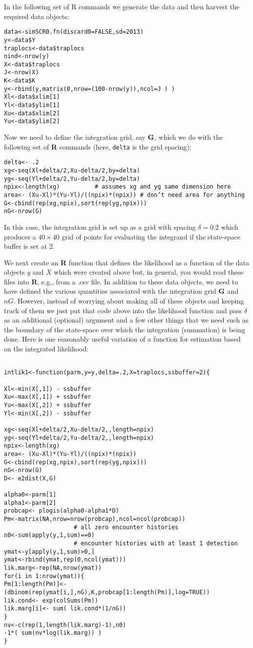 In the following set of R commands we generate the data and 
then harvest the required data objects:
\begin{verbatim}
data<-simSCR0.fn(discard0=FALSE,sd=2013)
y<-data$Y
traplocs<-data$traplocs
nind<-nrow(y)
X<-data$traplocs
J<-nrow(X)
K<-data$K
y<-rbind(y,matrix(0,nrow=(100-nrow(y)),ncol=J ) )
Xl<-data$xlim[1]
Yl<-data$ylim[1]
Xu<-data$xlim[2]
Yu<-data$ylim[2]
\end{verbatim}
Now we need to define the integration grid, say ${\bf G}$, which we do with
the following set of {\bf R} commands (here, \mbox{\tt delta} is the grid spacing):
\begin{verbatim}
delta<- .2
xg<-seq(Xl+delta/2,Xu-delta/2,by=delta) 
yg<-seq(Yl+delta/2,Yu-delta/2,by=delta) 
npix<-length(xg)          # assumes xg and yg same dimension here
area<- (Xu-Xl)*(Yu-Yl)/((npix)*(npix)) # don’t need area for anything
G<-cbind(rep(xg,npix),sort(rep(yg,npix)))
nG<-nrow(G)
\end{verbatim}
In this case, the integration grid is set up as a grid with spacing
$\delta = 0.2$ which produces a $40 \times 40$ grid of points for evaluating the
integrand if the state-space buffer is set at 2.

We next create an {\bf R} function that defines the likelihood as a function
of the data objects $y$ and $X$ which were created above but, in general,
you would read these files into {\bf R}, e.g., from a .csv file.
In addition to these data
objects, we need to have defined the various quantities associated
with the integration grid ${\bf G}$ and $nG$.
However, instead of worrying about making all of these objects and
keeping track of them we just put that code above into the likelihood
function and pass $\delta$ as an additional (optional) argument and a
few other things that we need such as the boundary of the state-space
over which the integration (summation) is being done.
Here is one reasonably useful variation of a function for estimation
based on the integrated likelihood:

{\small 
\begin{verbatim}

intlik1<-function(parm,y=y,delta=.2,X=traplocs,ssbuffer=2){

Xl<-min(X[,1]) - ssbuffer 
Xu<-max(X[,1]) + ssbuffer
Yu<-max(X[,2]) + ssbuffer
Yl<-min(X[,2]) - ssbuffer

xg<-seq(Xl+delta/2,Xu-delta/2,,length=npix) 
yg<-seq(Yl+delta/2,Yu-delta/2,,length=npix) 
npix<-length(xg)
area<- (Xu-Xl)*(Yu-Yl)/((npix)*(npix))
G<-cbind(rep(xg,npix),sort(rep(yg,npix)))
nG<-nrow(G)
D<- e2dist(X,G)  

alpha0<-parm[1]
alpha1<-parm[2]
probcap<- plogis(alpha0-alpha1*D)
Pm<-matrix(NA,nrow=nrow(probcap),ncol=ncol(probcap))
                    # all zero encounter histories
n0<-sum(apply(y,1,sum)==0) 
                    # encounter histories with at least 1 detection
ymat<-y[apply(y,1,sum)>0,] 
ymat<-rbind(ymat,rep(0,ncol(ymat)))
lik.marg<-rep(NA,nrow(ymat))
for(i in 1:nrow(ymat)){
Pm[1:length(Pm)]<- (dbinom(rep(ymat[i,],nG),K,probcap[1:length(Pm)],log=TRUE))
lik.cond<- exp(colSums(Pm))
lik.marg[i]<- sum( lik.cond*(1/nG))  
}
nv<-c(rep(1,length(lik.marg)-1),n0)
-1*( sum(nv*log(lik.marg)) )
}
\end{verbatim}
}


